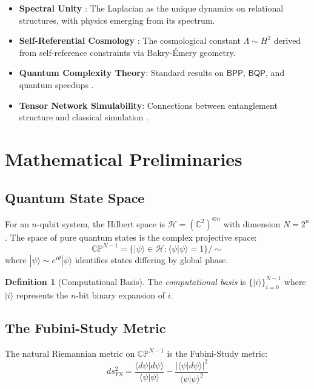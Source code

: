 \documentclass[11pt,a4paper]{article}
\theoremstyle{plain}
\theoremstyle{definition}
\newtheorem{definition}[theorem]{Definition}
\theoremstyle{remark}
\newcommand{\C}{\mathbb{C}}
\newcommand{\Hilbert}{\mathcal{H}}
\newcommand{\CP}{\mathbb{CP}}
\newcommand{\ket}[1]{|#1\rangle}
\newcommand{\braket}[2]{\langle#1|#2\rangle}
\newcommand{\BPP}{\mathsf{BPP}}
\newcommand{\BQP}{\mathsf{BQP}}
\begin{document}
\begin{itemize}[noitemsep]
    \item \textbf{Spectral Unity} \cite{spectral-unity}: The Laplacian as the unique dynamics on relational structures, with physics emerging from its spectrum.
    \item \textbf{Self-Referential Cosmology} \cite{self-ref-cosmology}: The cosmological constant $\Lambda \sim H^2$ derived from self-reference constraints via Bakry-\'Emery geometry.
    \item \textbf{Quantum Complexity Theory}: Standard results on $\BPP$, $\BQP$, and quantum speedups \cite{nielsen-chuang}.
    \item \textbf{Tensor Network Simulability}: Connections between entanglement structure and classical simulation \cite{vidal}.
\end{itemize}

\section{Mathematical Preliminaries}

\subsection{Quantum State Space}

For an $n$-qubit system, the Hilbert space is $\Hilbert = (\C^2)^{\otimes n}$ with dimension $N = 2^n$. The space of pure quantum states is the complex projective space:
\begin{equation}
    \CP^{N-1} = \{\ket{\psi} \in \Hilbert : \braket{\psi}{\psi} = 1\}/\!\sim
\end{equation}
where $\ket{\psi} \sim e^{i\theta}\ket{\psi}$ identifies states differing by global phase.

\begin{definition}[Computational Basis]
The \emph{computational basis} is $\{\ket{i}\}_{i=0}^{N-1}$ where $\ket{i}$ represents the $n$-bit binary expansion of $i$.
\end{definition}

\subsection{The Fubini-Study Metric}

The natural Riemannian metric on $\CP^{N-1}$ is the Fubini-Study metric:
\begin{equation}
    ds^2_{FS} = \frac{\langle d\psi|d\psi\rangle}{\langle\psi|\psi\rangle} - \frac{|\langle\psi|d\psi\rangle|^2}{\langle\psi|\psi\rangle^2}
\end{equation}
\end{document}
